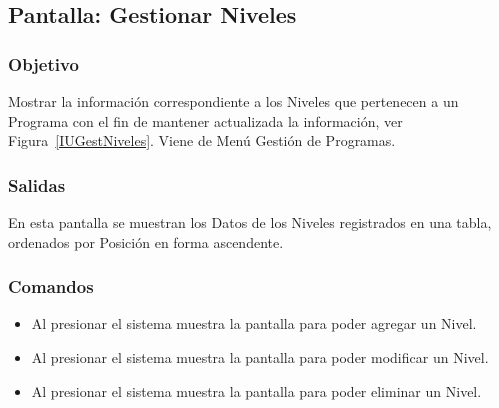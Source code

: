 \subsection{Pantalla: Gestionar Niveles}

\subsubsection{Objetivo}
  Mostrar la información correspondiente a los Niveles que pertenecen a un Programa con el fin de mantener actualizada la información, ver Figura~\ref{IUGestNiveles}. Viene de Menú Gestión de Programas.


\subsubsection{Salidas}
  En esta pantalla se muestran los Datos de los Niveles registrados en una tabla, ordenados por Posición en forma ascendente.

\subsubsection{Comandos}
\begin{itemize}
 \item Al presionar  el sistema muestra la pantalla  para poder agregar un Nivel.
 \item Al presionar  el sistema muestra la pantalla  para poder modificar un Nivel.
 \item Al presionar  el sistema muestra la pantalla  para poder eliminar un Nivel.
\end{itemize}

